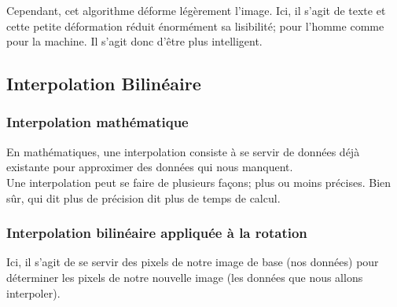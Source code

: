 Cependant, cet algorithme déforme légèrement l'image. Ici, il s'agit de texte et
cette petite déformation réduit énormément sa lisibilité; pour l'homme comme
pour la machine. Il s'agit donc d'être plus intelligent.

\subsection{Interpolation Bilinéaire}

\subsubsection{Interpolation mathématique}

En mathématiques, une interpolation consiste à se servir de données déjà
existante pour approximer des données qui nous manquent. \\

Une interpolation peut se faire de plusieurs façons; plus ou moins précises.
Bien sûr, qui dit plus de précision dit plus de temps de calcul.

\subsubsection{Interpolation bilinéaire appliquée à la rotation}

Ici, il s'agit de se servir des pixels de notre image de base (nos données) pour
déterminer les pixels de notre nouvelle image (les données que nous allons
interpoler). \\

